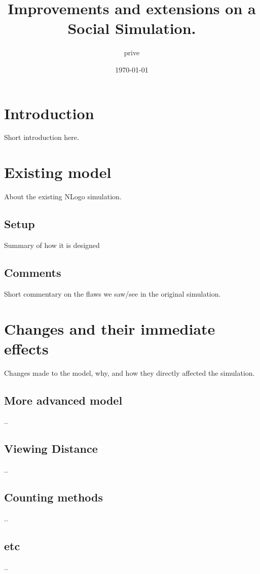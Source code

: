 \documentclass[a4paper]{article}
\title{Improvements and extensions on a Social Simulation.}
\author{prive}
\date{\today}
\begin{document}
\maketitle
\clearpage
\tableofcontents
\clearpage

\section{Introduction}
Short introduction here.

\clearpage

\section{Existing model}
About the existing NLogo simulation.

\subsection{Setup}
Summary of how it is designed

\subsection{Comments}
Short commentary on the flaws we saw/see in the original simulation.

\clearpage

\section{Changes and their immediate effects}
Changes made to the model, why, and how they directly  affected the simulation.

\subsection{More advanced model}
..

\subsection{Viewing Distance}
..

\subsection{Counting methods}
..

\subsection{etc}
..
\end{document}
